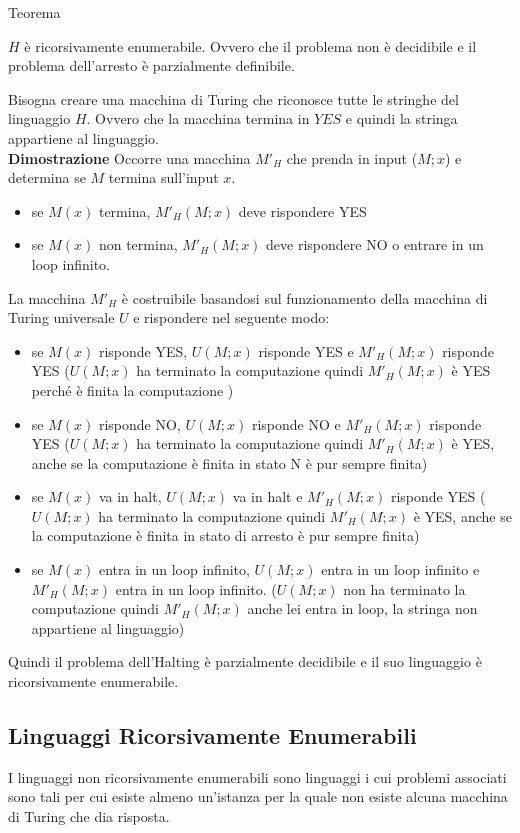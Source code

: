 \begin{teorema}{Teorema}{}
\par
$H$ è ricorsivamente enumerabile. Ovvero che il problema non è decidibile e il problema dell'arresto è parzialmente definibile.
\end{teorema}
Bisogna creare una macchina di Turing che riconosce tutte le stringhe del linguaggio $H$. Ovvero che la macchina termina in $YES$ e quindi la stringa appartiene al linguaggio. \\
\textbf{Dimostrazione}
Occorre una macchina $M'_H$ che prenda in input ($M;x$) e determina se $M$ termina sull’input $x$. 
\begin{itemize}
    \item se $M(x)$ termina, $M'_H(M;x)$ deve rispondere YES
    \item se $M(x)$ non termina, $M'_H(M;x)$ deve rispondere NO o entrare in un loop infinito.
\end{itemize}
La macchina $M'_H$ è costruibile basandosi sul funzionamento della macchina di Turing universale $U$ e rispondere nel seguente modo:
\begin{itemize}
    \item se $M(x)$ risponde YES, $U(M;x)$ risponde YES e $M'_H(M;x)$ risponde YES ($U(M;x)$ ha terminato la computazione quindi $M'_H(M;x)$ è YES perché è finita la computazione )
    \item se $M(x)$ risponde NO, $U(M;x)$ risponde NO e $M'_H(M;x)$ risponde YES ($U(M;x)$ ha terminato la computazione quindi $M'_H(M;x)$ è YES, anche se la computazione è finita in stato N è pur sempre finita)
    \item se $M(x)$ va in halt, $U(M;x)$ va in halt e $M'_H(M;x)$ risponde YES ($U(M;x)$ ha terminato la computazione quindi $M'_H(M;x)$ è YES, anche se la computazione è finita in stato di arresto è pur sempre finita)
    \item se $M(x)$ entra in un loop infinito, $U(M;x)$ entra in un loop infinito e $M'_H(M;x)$ entra in un loop infinito. ($U(M;x)$ non ha terminato la computazione quindi $M'_H(M;x)$ anche lei entra in loop, la stringa non appartiene al linguaggio) 
\end{itemize}
Quindi il problema dell’Halting è parzialmente decidibile e il suo linguaggio è ricorsivamente enumerabile.\\
\subsection{Linguaggi Ricorsivamente Enumerabili}
I linguaggi non ricorsivamente enumerabili sono linguaggi i cui problemi associati sono tali per cui esiste almeno un’istanza per la quale non esiste alcuna macchina di Turing che dia risposta.

